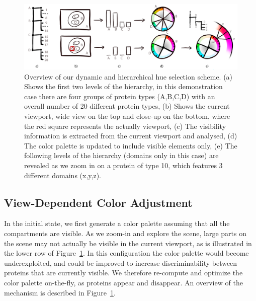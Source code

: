 \documentclass[review,journal]{vgtc}         %
\begin{document}
	
	
	\begin{figure}[t]
		\centering
		\includegraphics[width=0.95\linewidth]{Figures/coloroverview}
		\caption{Overview of our dynamic and hierarchical hue selection scheme. (a) Shows the first two levels of the hierarchy, in this demonstration case there are four groups of protein types (A,B,C,D) with an overall number of 20 different protein types, (b) Shows the current viewport, wide view on the top and close-up on the bottom, where the red square represents the actually viewport, (c) The visibility information is extracted from the current viewport and analysed, (d) The color palette is updated to include visible elements only, (e) The following levels of the hierarchy (domains only in this case) are revealed as we zoom in on a protein of type 10, which features 3 different domains (x,y,z).}
		\label{fig:coloroverview}
	\end{figure}
	
	\subsection{View-Dependent Color Adjustment}
	\label{sec:dynamic}
	
	In the initial state, we first generate a color palette assuming that all the compartments are visible.
	As we zoom-in and explore the scene, large parts on the scene may not actually be visible in the current viewport, as is illustrated in the lower row of Figure~\ref{fig:coloroverview}.
	In this configuration the color palette would become underexploited, and could be improved to increase discriminability between proteins that are currently visible. 
	We therefore re-compute and optimize the color palette on-the-fly, as proteins appear and disappear.
	An overview of the mechanism is described in Figure~\ref{fig:coloroverview}.
	
\end{document}
